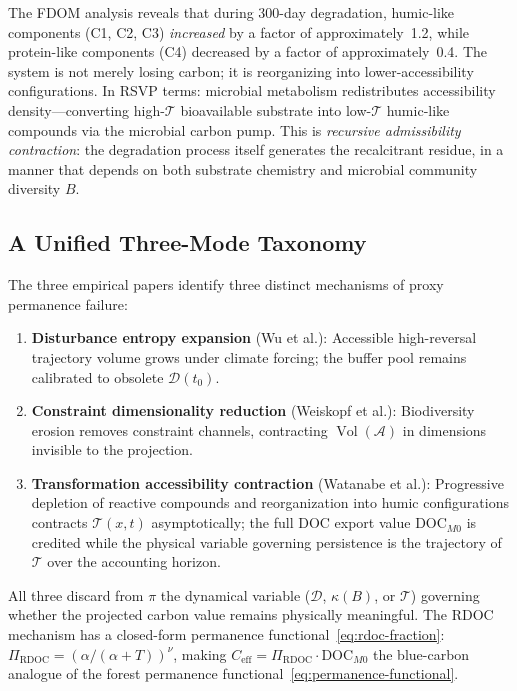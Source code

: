 \documentclass[12pt]{article}
\newcommand{\Acal}{\mathcal{A}}
\newcommand{\Tcal}{\mathcal{T}}
\newcommand{\vol}{\operatorname{Vol}}
\begin{document}
The FDOM analysis reveals that during 300-day degradation, humic-like components (C1,
C2, C3) \emph{increased} by a factor of approximately~1.2, while protein-like components
(C4) decreased by a factor of approximately~0.4. The system is not merely losing carbon;
it is reorganizing into lower-accessibility configurations. In RSVP terms: microbial
metabolism redistributes accessibility density---converting high-$\Tcal$ bioavailable
substrate into low-$\Tcal$ humic-like compounds via the microbial carbon pump. This is
\emph{recursive admissibility contraction}: the degradation process itself generates the
recalcitrant residue, in a manner that depends on both substrate chemistry and microbial
community diversity $B$.

\subsection{A Unified Three-Mode Taxonomy}

The three empirical papers identify three distinct mechanisms of proxy permanence failure:

\begin{enumerate}[leftmargin=*,label=\textbf{\arabic*.}]
\item \textbf{Disturbance entropy expansion} (Wu et al.): Accessible high-reversal
trajectory volume grows under climate forcing; the buffer pool remains calibrated to
obsolete $\mathcal{D}(t_0)$.

\item \textbf{Constraint dimensionality reduction} (Weiskopf et al.): Biodiversity
erosion removes constraint channels, contracting $\vol(\Acal)$ in dimensions invisible
to the projection.

\item \textbf{Transformation accessibility contraction} (Watanabe et al.): Progressive
depletion of reactive compounds and reorganization into humic configurations contracts
$\Tcal(x,t)$ asymptotically; the full DOC export value $\text{DOC}_{M0}$ is credited
while the physical variable governing persistence is the trajectory of $\Tcal$ over
the accounting horizon.
\end{enumerate}

All three discard from $\pi$ the dynamical variable ($\mathcal{D}$, $\kappa(B)$, or
$\Tcal$) governing whether the projected carbon value remains physically meaningful. The
RDOC mechanism has a closed-form permanence functional~\eqref{eq:rdoc-fraction}:
$\Pi_\text{RDOC}=(\alpha/(\alpha+T))^\nu$, making $C_\text{eff}=\Pi_\text{RDOC}\cdot
\text{DOC}_{M0}$ the blue-carbon analogue of the forest permanence functional~\eqref{eq:permanence-functional}.
\end{document}
